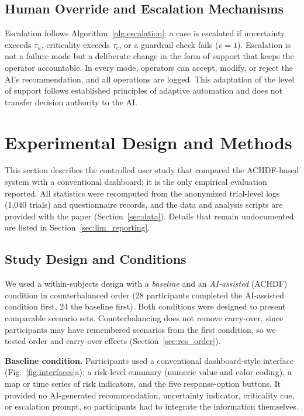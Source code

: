 \documentclass[journal]{IEEEtran}
\theoremstyle{plain}
\theoremstyle{definition}
\begin{document}
\subsection{Human Override and Escalation Mechanisms}
Escalation follows Algorithm~\ref{alg:escalation}: a case is escalated if uncertainty exceeds $\tau_u$, criticality exceeds $\tau_c$, or a guardrail check fails ($v=1$). Escalation is not a failure mode but a deliberate change in the form of support that keeps the operator accountable. In every mode, operators can accept, modify, or reject the AI's recommendation, and all operations are logged. This adaptation of the level of support follows established principles of adaptive automation \cite{Parasuraman2000LOA,Scerbo2007} and does not transfer decision authority to the AI.


    \section{Experimental Design and Methods}

    This section describes the controlled user study that compared the ACHDF-based system with a conventional dashboard; it is the only empirical evaluation reported. All statistics were recomputed from the anonymized trial-level logs (1,040 trials) and questionnaire records, and the data and analysis scripts are provided with the paper (Section~\ref{sec:data}). Details that remain undocumented are listed in Section~\ref{sec:lim_reporting}.

    \subsection{Study Design and Conditions}

    We used a within-subjects design with a \emph{baseline} and an \emph{AI-assisted} (ACHDF) condition in counterbalanced order (28 participants completed the AI-assisted condition first, 24 the baseline first). Both conditions were designed to present comparable scenario sets. Counterbalancing does not remove carry-over, since participants may have remembered scenarios from the first condition, so we tested order and carry-over effects (Section~\ref{sec:res_order}).

    \textbf{Baseline condition.} Participants used a conventional dashboard-style interface (Fig.~\ref{fig:interfaces}a): a risk-level summary (numeric value and color coding), a map or time series of risk indicators, and the five response-option buttons. It provided no AI-generated recommendation, uncertainty indicator, criticality cue, or escalation prompt, so participants had to integrate the information themselves.
\end{document}

